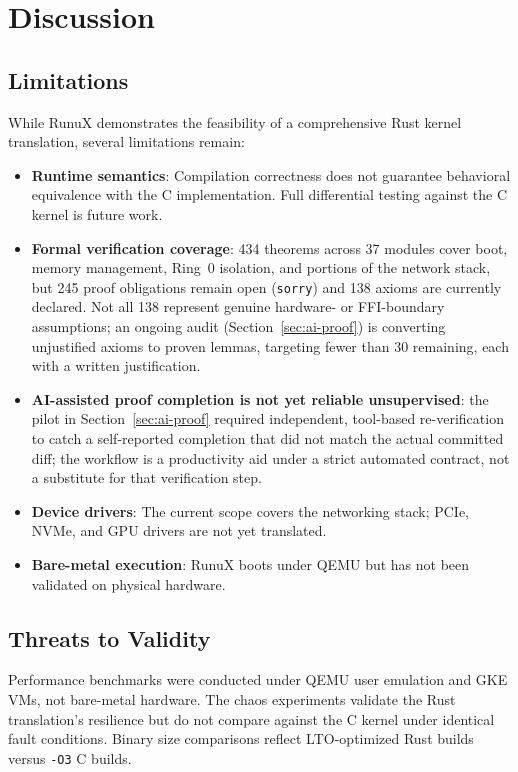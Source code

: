 \documentclass[sigconf,nonacm=false]{acmart}
\begin{document}
\section{Discussion}
\label{sec:discussion}

\subsection{Limitations}
While RunuX demonstrates the feasibility of a comprehensive Rust kernel translation, several limitations remain:
\begin{itemize}
    \item \textbf{Runtime semantics}: Compilation correctness does not guarantee behavioral equivalence with the C implementation. Full differential testing against the C kernel is future work.
    \item \textbf{Formal verification coverage}: 434 theorems across 37 modules cover boot, memory management, Ring~0 isolation, and portions of the network stack, but 245 proof obligations remain open (\texttt{sorry}) and 138 axioms are currently declared. Not all 138 represent genuine hardware- or FFI-boundary assumptions; an ongoing audit (Section~\ref{sec:ai-proof}) is converting unjustified axioms to proven lemmas, targeting fewer than 30 remaining, each with a written justification.
    \item \textbf{AI-assisted proof completion is not yet reliable unsupervised}: the pilot in Section~\ref{sec:ai-proof} required independent, tool-based re-verification to catch a self-reported completion that did not match the actual committed diff; the workflow is a productivity aid under a strict automated contract, not a substitute for that verification step.
    \item \textbf{Device drivers}: The current scope covers the networking stack; PCIe, NVMe, and GPU drivers are not yet translated.
    \item \textbf{Bare-metal execution}: RunuX boots under QEMU but has not been validated on physical hardware.
\end{itemize}

\subsection{Threats to Validity}
Performance benchmarks were conducted under QEMU user emulation and GKE VMs, not bare-metal hardware. The chaos experiments validate the Rust translation's resilience but do not compare against the C kernel under identical fault conditions. Binary size comparisons reflect LTO-optimized Rust builds versus \texttt{-O3} C builds.
\end{document}
